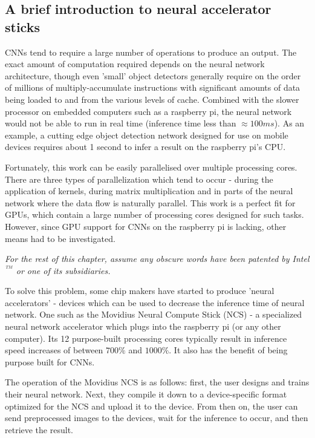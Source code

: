 \subsection{A brief introduction to neural accelerator sticks}
CNNs tend to require a large number of operations to produce an output. The exact amount of computation required depends on the neural network architecture, though even 'small' object detectors generally require on the order of millions of multiply-accumulate instructions with significant amounts of data being loaded to and from the various levels of cache. Combined with the slower processor on embedded computers such as a raspberry pi, the neural network would not be able to run in real time (inference time less than $\approx 100ms$). As an example, a cutting edge object detection network designed for use on mobile devices requires about 1 second to infer a result on the raspberry pi's CPU.


Fortunately, this work can be easily parallelised over multiple processing cores. There are three types of parallelization which tend to occur - during the application of kernels, during matrix multiplication and in parts of the neural network where the data flow is naturally parallel. This work is a perfect fit for GPUs, which contain a large number of processing cores designed for such tasks. However, since GPU support for CNNs on the raspberry pi is lacking, other means had to be investigated.


\textit{For the rest of this chapter, assume any obscure words have been patented by Intel$^{^{\ TM}}$ or one of its subsidiaries.}

To solve this problem, some chip makers have started to produce 'neural accelerators' - devices which can be used to decrease the inference time of neural network. One such as the Movidius Neural Compute Stick (NCS) - a specialized neural network accelerator which plugs into the raspberry pi (or any other computer). Its 12 purpose-built processing cores typically result in inference speed increases of between $700\%$ and $1000\%$. It also has the benefit of being purpose built for CNNs.

The operation of the Movidius NCS is as follows: first, the user designs and trains their neural network. Next, they compile it down to a device-specific format optimized for the NCS and upload it to the device. From then on, the user can send preprocessed images to the devices, wait for the inference to occur, and then retrieve the result.


